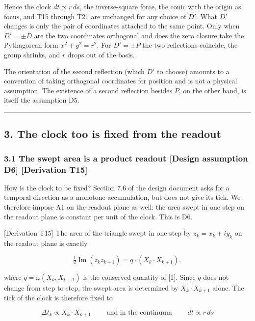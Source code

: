 \documentclass[
  a4paper,
]{article}
\begin{document}
Hence the clock \(dt\propto r\,ds\), the inverse-square force, the conic
with the origin as focus, and T15 through T21 are unchanged for any
choice of \(D'\). What \(D'\) changes is only the pair of coordinates
attached to the same point. Only when \(D'=\pm D\) are the two
coordinates orthogonal and does the zero closure take the Pythagorean
form \(x^2+y^2=r^2\). For \(D'=\pm P\) the two reflections coincide, the
group shrinks, and \(r\) drops out of the basis.

The orientation of the second reflection (which \(D'\) to choose)
amounts to a convention of taking orthogonal coordinates for position
and is not a physical assumption. The existence of a second reflection
besides \(P\), on the other hand, is itself the assumption D5.

\begin{center}\rule{0.5\linewidth}{0.5pt}\end{center}

\subsection{3. The clock too is fixed from the
readout}\label{the-clock-too-is-fixed-from-the-readout}

\subsubsection{3.1 The swept area is a product readout {[}Design
assumption D6{]} {[}Derivation
T15{]}}\label{the-swept-area-is-a-product-readout-design-assumption-d6-derivation-t15}

How is the clock to be fixed? Section 7.6 of the design document asks
for a temporal direction as a monotone accumulation, but does not give
its tick. We therefore impose A1 on the readout plane as well: the area
swept in one step on the readout plane is constant per unit of the
clock. This is D6.

{[}Derivation T15{]} The area of the triangle swept in one step by
\(z_k=x_k+iy_k\) on the readout plane is exactly

\[
\tfrac12\operatorname{Im}(\bar z_kz_{k+1})=q\cdot(X_k\cdot X_{k+1}),
\]

where \(q=\omega(X_k,X_{k+1})\) is the conserved quantity of {[}1{]}.
Since \(q\) does not change from step to step, the swept area is
determined by \(X_k\cdot X_{k+1}\) alone. The tick of the clock is
therefore fixed to

\[
\boxed{\;\Delta t_k\propto X_k\cdot X_{k+1}\;}\qquad\text{and in the continuum}\qquad\boxed{\;dt\propto r\,ds\;}
\]
\end{document}

